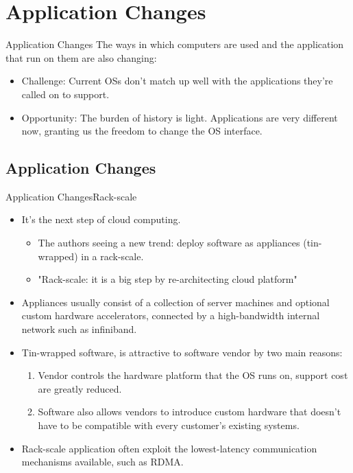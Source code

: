 \documentclass[10pt]{beamer}
\begin{document}
\section{Application Changes}
\begin{frame}{Application Changes}{}
The ways in which computers are used and the application that run on them are
also changing:

  \begin{itemize}
    \item Challenge: Current OSs don't match up well with the applications
          they're called on to support.
    \item Opportunity: The burden of history is light. Applications are very
          different now, granting us the freedom to change the OS interface.
  \end{itemize}
\end{frame}

\subsection{Application Changes}
\begin{frame}{Application Changes}{Rack-scale}
  \begin{itemize}
    \item It's the next step of cloud computing.
    \begin{itemize}
      \item The authors seeing a new trend: deploy software as appliances
            (tin-wrapped) in a rack-scale.
      \item "Rack-scale: it is a big step by re-architecting cloud platform"
    \end{itemize}
    \item Appliances usually consist of a collection of server machines and
          optional custom hardware accelerators, connected by a high-bandwidth
          internal network such as infiniband.
    \item Tin-wrapped software, is attractive to software vendor by two main
          reasons:
      \begin{enumerate}
        \item Vendor controls the hardware platform that the OS runs on,
               support cost are greatly reduced.
        \item Software also allows vendors to introduce custom hardware that
              doesn't have to be compatible with every customer's existing
              systems.
      \end{enumerate}
    \item Rack-scale application often exploit the lowest-latency communication
          mechanisms available, such as RDMA.
  \end{itemize}
\end{frame}
\end{document}
